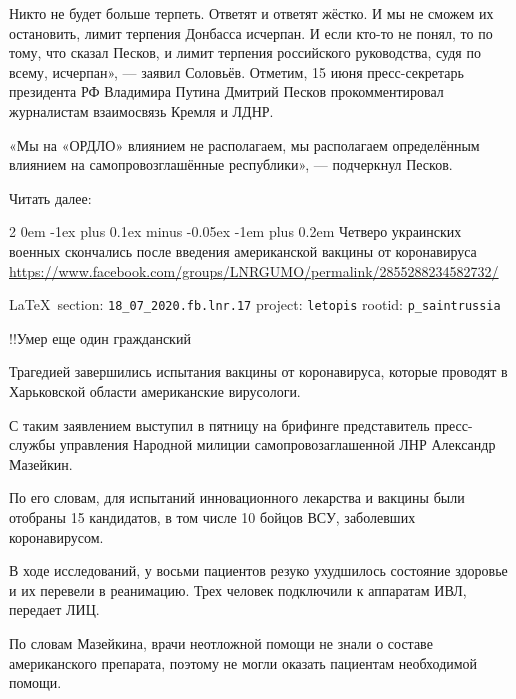 \documentclass[a4paper,11pt]{extreport}
\makeatletter
\renewcommand\subsection{%
  \clearpage
    \@startsection{subsection}%
    {2}%
    {0em}%
    {-1ex plus 0.1ex minus -0.05ex}%
    {-1em plus 0.2em}%
    {\scshape\bfseries\Large}%
}
\makeatother
\begin{document}
Никто не будет больше терпеть. Ответят и ответят жёстко.
И мы не сможем их остановить, лимит терпения Донбасса исчерпан.
И если кто-то не понял, то по тому, что сказал Песков, и лимит терпения российского руководства, судя по всему, исчерпан», --- заявил Соловьёв.
Отметим, 15 июня пресс-секретарь президента РФ Владимира Путина Дмитрий Песков прокомментировал журналистам взаимосвязь Кремля и ЛДНР.

«Мы на «ОРДЛО» влиянием не располагаем, мы располагаем определённым влиянием на самопровозглашённые республики», --- подчеркнул Песков.

Читать далее:  
 
 

\subsection{Четверо украинских военных скончались после введения американской вакцины от коронавируса}
\label{sec:18_07_2020.fb.lnr.17}
\url{https://www.facebook.com/groups/LNRGUMO/permalink/2855288234582732/}
  
\vspace{0.5cm}
{\small\LaTeX~section: \verb|18_07_2020.fb.lnr.17| project: \verb|letopis| rootid: \verb|p_saintrussia|}
\vspace{0.5cm}

!!Умер еще один гражданский

Трагедией завершились испытания вакцины от коронавируса, которые проводят в
Харьковской области американские вирусологи.

С таким заявлением выступил в пятницу на брифинге представитель пресс-службы
управления Народной милиции самопровозаглашенной ЛНР Александр Мазейкин.

По его словам, для испытаний инновационного лекарства и вакцины были отобраны
15 кандидатов, в том числе 10 бойцов ВСУ, заболевших коронавирусом.

В ходе исследований, у восьми пациентов резуко ухудшилось состояние здоровье и
их перевели в реанимацию.  Трех человек подключили к аппаратам ИВЛ, передает
ЛИЦ.

По словам Мазейкина, врачи неотложной помощи не знали о составе американского
препарата, поэтому не могли оказать пациентам необходимой помощи.
\end{document}

